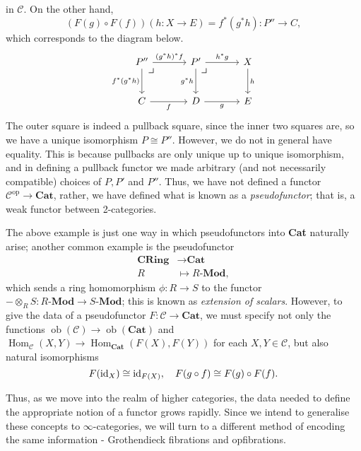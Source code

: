 \documentclass{MetricNotes2023}
\def\id{\ensuremath\text{id}}
\DeclareMathOperator{\Hom}{Hom}
\DeclareMathOperator{\ob}{ob}
\begin{document}
in \(\mathcal{C}\). On the other hand, 
\[(F(g)\circ F(f))(h : X \to E)=f^*(g^*h) : P'' \to C,\] which corresponds to the diagram below.
\[\begin{tikzcd}[column sep=8ex, row sep=6ex]
P'' \arrow[r, "(g^*h)^*f"] \arrow[d, swap, "f^*(g^*h)"] \arrow[dr, phantom, "\scalebox{1.3}{$\lrcorner$}" {xshift=-18pt, yshift=12pt}] & P' \arrow[r, "h^*g"] \arrow[d, swap, "g^*h"] \arrow[dr, phantom, "\scalebox{1.3}{$\lrcorner$}" {xshift=-18pt, yshift=12pt}] & X \arrow[d, "h"]  \\
C \arrow[r, swap, "f"]  & D \arrow[r, swap, "g"] & E
\end{tikzcd}\]
The outer square is indeed a pullback square, since the inner two squares are, so we have a unique isomorphism \(P \cong P''\). However, we do not in general have equality. This is because pullbacks are only unique up to unique isomorphism, and in defining a pullback functor we made arbitrary (and not necessarily compatible) choices of \(P, P'\) and \(P''\). Thus, we have not defined a functor \(\mathcal{C}^{\text{op}}\to \textbf{Cat}\), rather, we have defined what is known as a \textit{pseudofunctor}; that is, a weak functor between 2-categories. 

The above example is just one way in which pseudofunctors into \textbf{Cat} naturally arise; another common example is the pseudofunctor
\begin{align*}
\textbf{CRing}&\to \textbf{Cat}\\
R\; &\mapsto R \textbf{-Mod},
\end{align*}
which sends a ring homomorphism \(\phi : R \to S\) to the functor \(-\otimes_R S : R \textbf{-Mod}\to S \textbf{-Mod}\); this is known as \textit{extension of scalars}. However, to give the data of a pseudofunctor \(F : \mathcal{C} \to \textbf{Cat}\), we must specify not only the functions \(\ob(\mathcal{C})\to \ob(\textbf{Cat})\) and \(\Hom_\mathcal{C}(X, Y)\to \Hom_\textbf{Cat}(F(X), F(Y))\) for each \(X, Y \in \mathcal{C}\), but also natural isomorphisms
\[F(\id_X) \cong \id_{F(X)}, \quad F(g \circ f) \cong F(g) \circ F(f).\]

Thus, as we move into the realm of higher categories, the data needed to define the appropriate notion of a functor grows rapidly. Since we intend to generalise these concepts to \(\infty\)-categories, we will turn to a different method of encoding the same information - Grothendieck fibrations and opfibrations.
\end{document}
